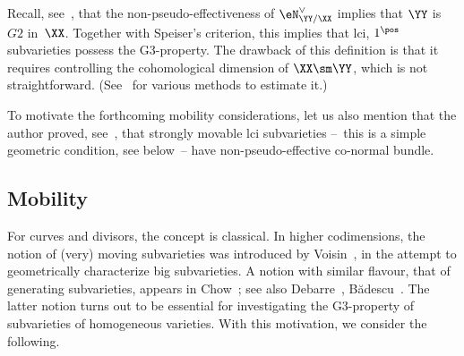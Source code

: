 Recall, see~\cite[Corollary 2.6]{hlc-g2}, that the non-pseudo-effectiveness of $\eN_{\YY/\XX}^\vee$ implies that $\YY$ is $G2$ in~$\XX$. Together with Speiser's criterion, this implies that lci, $1^\pos$ subvarieties possess the G3-property. The drawback of this definition is that it requires controlling the cohomological dimension of $\XX\sm\YY$, which is not straightforward. (See~\cite{hlc+taj} for various methods to estimate it.)

To motivate the forthcoming mobility considerations, let us also mention that the author proved, see~\cite[Proposition 3.5]{hlc-g2}, that strongly movable lci subvarieties --~this is a simple geometric condition, see below~-- have non-pseudo-effective co-normal bundle. 


\subsection{Mobility}

For curves and divisors, the concept is classical. In higher codimensions, the notion of (very) moving subvarieties was introduced by Voisin~\cite{voisin-coniv}, in the attempt to geometrically characterize big subvarieties. A notion with similar flavour, that of generating subvarieties, appears in Chow~\cite{chow}; see also Debarre~\cite{dbar-mumford}, B\u{a}descu~\cite{bad}. The latter notion turns out to be essential for investigating the G3-property of subvarieties of homogeneous varieties. With this motivation, we consider the following. 

